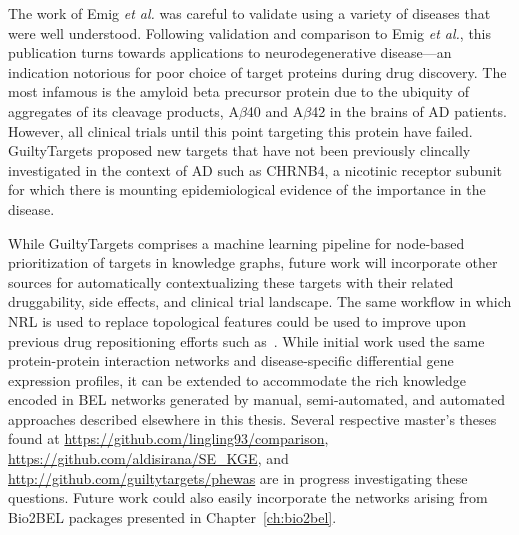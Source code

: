 The work of Emig \textit{et al.} was careful to validate using a variety of diseases that were well understood.
Following validation and comparison to Emig \textit{et al.}, this publication turns towards applications to neurodegenerative disease---an indication notorious for poor choice of target proteins during drug discovery.
The most infamous is the amyloid beta precursor protein due to the ubiquity of aggregates of its cleavage products, A$\beta$40 and A$\beta$42 in the brains of \ac{AD} patients.
However, all clinical trials until this point targeting this protein have failed.
GuiltyTargets proposed new targets that have not been previously clincally investigated in the context of \ac{AD} such as CHRNB4, a nicotinic receptor subunit for which there is mounting epidemiological evidence of the importance in the disease.

While GuiltyTargets comprises a machine learning pipeline for node-based prioritization of targets in knowledge graphs, future work will incorporate other sources for automatically contextualizing these targets with their related druggability, side effects, and clinical trial landscape.
The same workflow in which \ac{NRL} is used to replace topological features could be used to improve upon previous drug repositioning efforts such as~\cite{Himmelstein2017}.
While initial work used the same protein-protein interaction networks and disease-specific differential gene expression profiles, it can be extended to accommodate the rich knowledge encoded in \ac{BEL} networks generated by manual, semi-automated, and automated approaches described elsewhere in this thesis.
Several respective master's theses found at \url{https://github.com/lingling93/comparison}, \url{https://github.com/aldisirana/SE_KGE}, and \url{http://github.com/guiltytargets/phewas} are in progress investigating these questions.
Future work could also easily incorporate the networks arising from Bio2BEL packages presented in Chapter~\ref{ch:bio2bel}.
